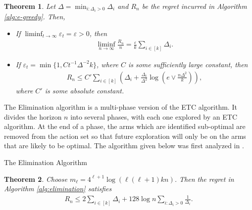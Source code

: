 \documentclass[letterpaper,11pt,openright,openany]{book}
\numberwithin{equation}{section}
\theoremstyle{plain}
\newtheorem{Th}{Theorem}[section]
\theoremstyle{definition}
\def\e{{\varepsilon}}
\begin{document}
\begin{Th}\label{thm:e-greedy}
Let $\Delta=\min_{i: \Delta_i>0}\Delta_i$ and $R_n$ be the regret incurred in Algorithm \ref{alg:e-greedy}.  Then,
\begin{itemize}
\item If $\liminf_{t\to\infty}\e_t=\e>0$, then
\begin{align*}
\liminf_{n\to\infty}\frac{R_n}{n}=\frac{\e}{k}\sum_{i\in [k]}\Delta_i. 
\end{align*} 
\item If $\e_t = \min\{1, Ct^{-1}\Delta^{-2}k\}$, where $C$ is some sufficiently large constant, then
\begin{align*}
R_n\leq C'\sum_{i\in [k]}\left(\Delta_i+\frac{\Delta_i}{\Delta^2}\log\left(e\vee \frac{n\Delta^2}{k}\right)\right),
\end{align*}
where $C'$ is some absolute constant. 
\end{itemize}
\end{Th}


The Elimination algorithm is a multi-phase version of the ETC algorithm. It divides the horizon $n$ into several phases, with each one explored by an ETC algorithm. At the end of a phase, the arms which are identified sub-optimal are removed from the action set so that future exploration will only be on the arms that are likely to be optimal. The algorithm given below was first analyzed in \cite{Auer_2010}.  

\begin{algorithm}[H]
 \begin{algorithmic}[1]
\ENDFOR
 \end{algorithmic}
\caption{The Elimination Algorithm} 
\label{alg:elimination}
\end{algorithm}

\begin{Th}\label{elim}
Choose $m_\ell = 4^{\ell+1}\log(\ell(\ell+1)kn)$. Then the regret in Algorithm \ref{alg:elimination} satisfies
\begin{align*}
R_n\leq 2\sum_{i\in [k]}\Delta_i + 128\log n\sum_{i: \Delta_i>0}\frac{1}{\Delta_i}. 
\end{align*}
\end{Th}
\end{document}

